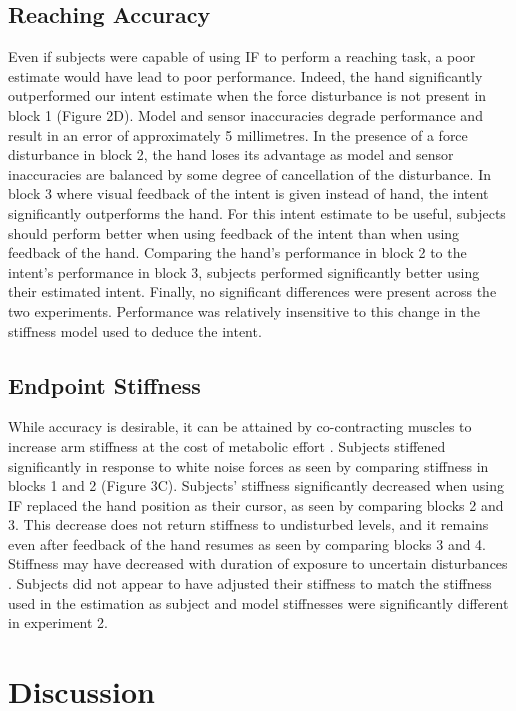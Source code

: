 \documentclass{frontiersSCNS} %
\begin{document}
\subsection*{Reaching Accuracy}
Even if subjects were capable of using IF to perform a reaching task, a poor estimate would have lead to poor performance. Indeed, the hand significantly outperformed our intent estimate when the force disturbance is not present in block 1 (Figure 2D). Model and sensor inaccuracies degrade performance and result in an error of approximately 5 millimetres. In the presence of a force disturbance in block 2, the hand loses its advantage as model and sensor inaccuracies are balanced by some degree of cancellation of the disturbance. In block 3 where visual feedback of the intent is given instead of hand, the intent significantly outperforms the hand. For this intent estimate to be useful, subjects should perform better when using feedback of the intent than when using feedback of the hand. Comparing the hand's performance in block 2 to the intent's performance in block 3, subjects performed significantly better using their estimated intent. Finally, no significant differences were present across the two experiments. Performance was relatively insensitive to this change in the stiffness model used to deduce the intent.

\subsection*{Endpoint Stiffness}
While accuracy is desirable, it can be attained by co-contracting muscles to increase arm stiffness at the cost of metabolic effort \citep{gribble2003role, takahashi2001impedance}. Subjects stiffened significantly in response to white noise forces as seen by comparing stiffness in blocks 1 and 2 (Figure 3C). Subjects' stiffness significantly decreased when using IF replaced the hand position as their cursor, as seen by comparing blocks 2 and 3. This decrease does not return stiffness to undisturbed levels, and it remains even after feedback of the hand resumes as seen by comparing blocks 3 and 4. Stiffness may have decreased with duration of exposure to uncertain disturbances \citep{takahashi2001impedance}. Subjects did not appear to have adjusted their stiffness to match the stiffness used in the estimation as subject and model stiffnesses were significantly different in experiment 2.

\section{Discussion}
\end{document}

